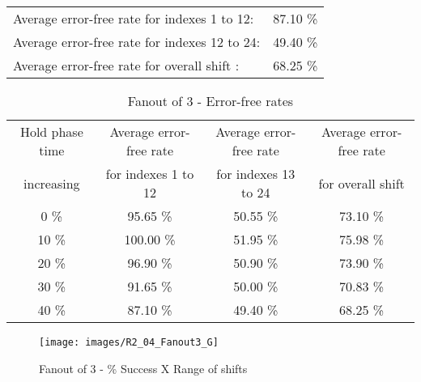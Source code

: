 \begin{table}[h]
\begin{center}
\begin{tabular}{|c|c|c|c|c|}
\end{tabular}


\flushleft
\begin{tabular}{l l}
Average error-free rate for indexes  1 to 12: &  87.10 \% \\
Average error-free rate for indexes 12 to 24: &  49.40 \% \\
Average error-free rate for overall shift   : &  68.25 \% \\

\end{tabular}


\end{center}
\end{table}



\begin{table}[h]
\begin{center}
\caption{Fanout of 3 - Error-free rates}
\begin{tabular}{|c|c|c|c|}
\hline
Hold phase time   & Average error-free rate  & Average error-free rate  & Average error-free rate  \\
increasing & for indexes  1 to 12 & for indexes 13 to 24 & for overall shift \\
\hline
0  \% &  95.65 \% & 50.55 \% & 73.10 \% \\
\hline
10 \% &  100.00 \% & 51.95 \% & 75.98 \% \\
\hline
20 \% & 96.90 \% & 50.90 \% & 73.90 \% \\
\hline
30 \% & 91.65 \% & 50.00 \% & 70.83 \% \\
\hline
40 \% & 87.10 \% & 49.40 \% & 68.25 \% \\
\hline


\end{tabular}

\end{center}
\end{table}


\pagebreak
\begin{figure}[h!]
\center
\texttt{[image: images/R2\_04\_Fanout3\_G]}
\caption{Fanout of 3 -  \% Success X Range of shifts}
\label{figure:Fanout3_reg_gt1}
\end{figure}

